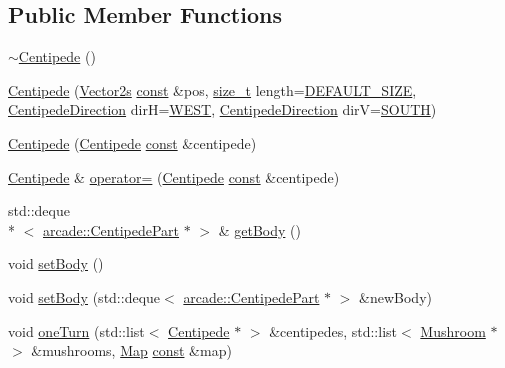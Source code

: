 \subsection*{Public Member Functions}
\begin{DoxyCompactItemize}
\item 
\hyperlink{classarcade_1_1_centipede_a6e8de7adad1de42cfdea280ca573554c}{$\sim$\-Centipede} ()
\item 
\hyperlink{classarcade_1_1_centipede_ab7ae00c32a1fdbe899b0be6e0f32b66a}{Centipede} (\hyperlink{namespacearcade_a8e527f7400fbff9c38dc31e0a3dd06a1}{Vector2s} \hyperlink{term__entry_8h_a57bd63ce7f9a353488880e3de6692d5a}{const} \&pos, \hyperlink{nc__alloc_8h_a7b60c5629e55e8ec87a4547dd4abced4}{size\-\_\-t} length=\hyperlink{_centipede_8hpp_a9771cabfd673a8e350f1f8ce0b8f458f}{D\-E\-F\-A\-U\-L\-T\-\_\-\-S\-I\-Z\-E}, \hyperlink{classarcade_1_1_centipede_a5ee9df78614426762a3960348e1bc27b}{Centipede\-Direction} dir\-H=\hyperlink{classarcade_1_1_centipede_a5ee9df78614426762a3960348e1bc27ba177a3ef7ab855bde37c9abe7bbdbdfad}{W\-E\-S\-T}, \hyperlink{classarcade_1_1_centipede_a5ee9df78614426762a3960348e1bc27b}{Centipede\-Direction} dir\-V=\hyperlink{classarcade_1_1_centipede_a5ee9df78614426762a3960348e1bc27ba23f74b2268eacbde2d764036693e081a}{S\-O\-U\-T\-H})
\item 
\hyperlink{classarcade_1_1_centipede_ae38648ca7f41faa6c882157604446008}{Centipede} (\hyperlink{classarcade_1_1_centipede}{Centipede} \hyperlink{term__entry_8h_a57bd63ce7f9a353488880e3de6692d5a}{const} \&centipede)
\item 
\hyperlink{classarcade_1_1_centipede}{Centipede} \& \hyperlink{classarcade_1_1_centipede_a908922296dc7e851eb5bedf3c35f0df9}{operator=} (\hyperlink{classarcade_1_1_centipede}{Centipede} \hyperlink{term__entry_8h_a57bd63ce7f9a353488880e3de6692d5a}{const} \&centipede)
\item 
std\-::deque\\*
$<$ \hyperlink{classarcade_1_1_centipede_part}{arcade\-::\-Centipede\-Part} $\ast$ $>$ \& \hyperlink{classarcade_1_1_centipede_ab6ed7bd5652b14d4f7f862e3cde61071}{get\-Body} ()
\item 
void \hyperlink{classarcade_1_1_centipede_a848c877d4dddb4e7354e19832ad5d0eb}{set\-Body} ()
\item 
void \hyperlink{classarcade_1_1_centipede_ae44e01f5c6fa7c116fc4ab18b8a392ef}{set\-Body} (std\-::deque$<$ \hyperlink{classarcade_1_1_centipede_part}{arcade\-::\-Centipede\-Part} $\ast$ $>$ \&new\-Body)
\item 
void \hyperlink{classarcade_1_1_centipede_a7d3d58443cd9b072211cb5773f2e8510}{one\-Turn} (std\-::list$<$ \hyperlink{classarcade_1_1_centipede}{Centipede} $\ast$ $>$ \&centipedes, std\-::list$<$ \hyperlink{classarcade_1_1_mushroom}{Mushroom} $\ast$ $>$ \&mushrooms, \hyperlink{classarcade_1_1_map}{Map} \hyperlink{term__entry_8h_a57bd63ce7f9a353488880e3de6692d5a}{const} \&map)

\end{DoxyCompactItemize}
